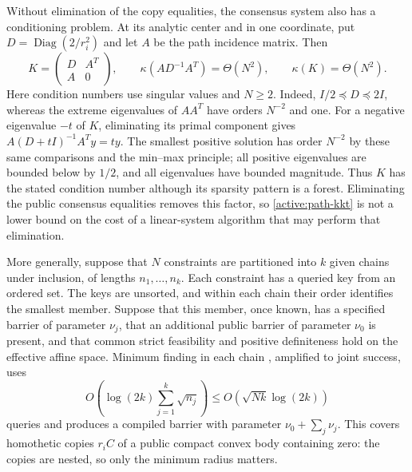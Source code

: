 Without elimination of the copy equalities, the consensus system also
has a conditioning problem. At its analytic center and in one
coordinate, put
$D=\operatorname{Diag}(2/r_i^2)$ and let $A$ be the path incidence
matrix. Then
\begin{equation}\label{active:path-kkt}
 K=\begin{pmatrix}D&A^T\\A&0\end{pmatrix},\qquad
 \kappa(AD^{-1}A^T)=\Theta(N^2),\qquad
 \kappa(K)=\Theta(N^2).
\end{equation}
Here condition numbers use singular values and $N\geq2$.
Indeed, $I/2\preceq D\preceq2I$, whereas the extreme eigenvalues of
$AA^T$ have orders $N^{-2}$ and one. For a negative eigenvalue
$-t$ of $K$, eliminating its primal component gives
$A(D+tI)^{-1}A^Ty=t y$. The smallest positive solution has order
$N^{-2}$ by these same comparisons and the min--max principle;
all positive eigenvalues are bounded below by $1/2$, and all
eigenvalues have bounded magnitude. Thus $K$ has the stated
condition number although its sparsity pattern is a forest.
Eliminating the public consensus equalities removes this factor, so
\eqref{active:path-kkt} is not a lower bound on the cost of a
linear-system algorithm that may perform that elimination.

More generally, suppose that $N$ constraints are partitioned into $k$
given chains under inclusion, of lengths $n_1,\ldots,n_k$. Each
constraint has a queried key from an ordered set. The keys are
unsorted, and within each chain their order identifies the smallest
member. Suppose that this member, once known, has a
specified barrier of parameter $\nu_j$, that an additional public
barrier of parameter $\nu_0$ is present, and that common strict
feasibility and positive definiteness hold on the effective affine
space. Minimum finding in each chain \cite{DurrHoyer1996}, amplified to
joint success, uses
\begin{equation}\label{active:chains}
 O\!\left(\log(2k)\sum_{j=1}^k\sqrt{n_j}\right)
 \leq O\!\left(\sqrt{Nk}\log(2k)\right)
\end{equation}
queries and produces a compiled barrier with parameter
$\nu_0+\sum_j\nu_j$. This covers homothetic copies $r_i C$ of a public
compact convex body containing zero: the copies are nested, so only
the minimum radius matters.

